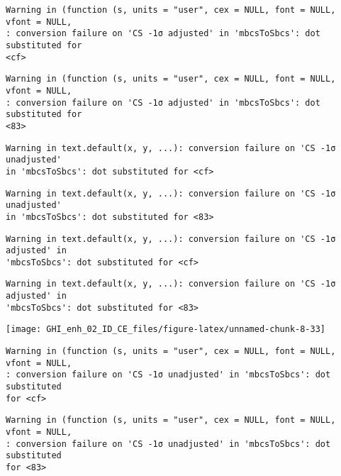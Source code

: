 \documentclass[
  10pt,
  a4paper,oneside]{article}
\begin{document}
\begin{verbatim}
Warning in (function (s, units = "user", cex = NULL, font = NULL, vfont = NULL,
: conversion failure on 'CS -1σ adjusted' in 'mbcsToSbcs': dot substituted for
<cf>
\end{verbatim}

\begin{verbatim}
Warning in (function (s, units = "user", cex = NULL, font = NULL, vfont = NULL,
: conversion failure on 'CS -1σ adjusted' in 'mbcsToSbcs': dot substituted for
<83>
\end{verbatim}

\begin{verbatim}
Warning in text.default(x, y, ...): conversion failure on 'CS -1σ unadjusted'
in 'mbcsToSbcs': dot substituted for <cf>
\end{verbatim}

\begin{verbatim}
Warning in text.default(x, y, ...): conversion failure on 'CS -1σ unadjusted'
in 'mbcsToSbcs': dot substituted for <83>
\end{verbatim}

\begin{verbatim}
Warning in text.default(x, y, ...): conversion failure on 'CS -1σ adjusted' in
'mbcsToSbcs': dot substituted for <cf>
\end{verbatim}

\begin{verbatim}
Warning in text.default(x, y, ...): conversion failure on 'CS -1σ adjusted' in
'mbcsToSbcs': dot substituted for <83>
\end{verbatim}

\begin{center}\texttt{[image: GHI\_enh\_02\_ID\_CE\_files/figure-latex/unnamed-chunk-8-33]} \end{center}

\begin{verbatim}
Warning in (function (s, units = "user", cex = NULL, font = NULL, vfont = NULL,
: conversion failure on 'CS -1σ unadjusted' in 'mbcsToSbcs': dot substituted
for <cf>
\end{verbatim}

\begin{verbatim}
Warning in (function (s, units = "user", cex = NULL, font = NULL, vfont = NULL,
: conversion failure on 'CS -1σ unadjusted' in 'mbcsToSbcs': dot substituted
for <83>
\end{verbatim}
\end{document}
